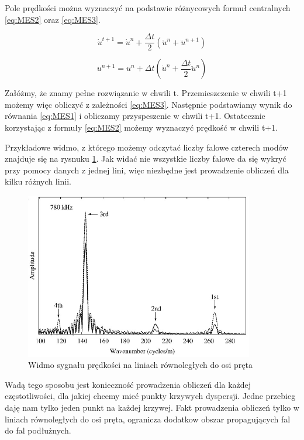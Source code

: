 Pole prędkości można wyznaczyć na podstawie różnycowych formuł centralnych \ref{eq:MES2} oraz \ref{eq:MES3}.

\begin{equation} \label{eq:MES2}
\dot u^{t+1} = \dot u^n + \frac{\Delta t}{2}(\ddot u^n + \ddot u^{n+1})
\end{equation}

\begin{equation} \label{eq:MES3}
u^{n+1} = u^n + \Delta t(\dot u^n + \frac{\Delta t}{2}\ddot u^n)
\end{equation}

Załóżmy, że znamy pełne rozwiązanie w chwili t. Przemieszczenie w chwili t+1 możemy więc obliczyć z zależności \ref{eq:MES3}. Następnie podstawiamy wynik do równania \ref{eq:MES1} i obliczamy przyspeszenie w chwili t+1. Ostatecznie korzystając z formuły \ref{eq:MES2} możemy wyznaczyć prędkość w chwili t+1.

Przykładowe widmo, z którego możemy odczytać liczby falowe czterech modów znajduje się na rysnuku \ref{fig:widmo_wymuszenie1}. Jak widać nie wszystkie liczby falowe da się wykryć przy pomocy danych z jednej lini, więc niezbędne jest prowadzenie obliczeń dla kilku różnych linii.

\begin{figure}[h]
\centering
\includegraphics[width=10cm]{Zdjecia/2/widmo_wymuszenia_waskopasmowe}
\caption{Widmo sygnału prędkości na liniach równoległych do osi pręta \cite{bartek_valsamos}}
\label{fig:widmo_wymuszenie1}
\end{figure}

Wadą tego sposobu jest konieczność prowadzenia obliczeń dla każdej częstotliwości, dla jakiej chcemy mieć punkty krzywych dyspersji. Jedne przebieg daję nam tylko jeden punkt na każdej krzywej. Fakt prowadzenia obliczeń tylko w liniach równoległych do osi pręta, ogranicza dodatkow obszar propagujących fal do fal podłużnych.

